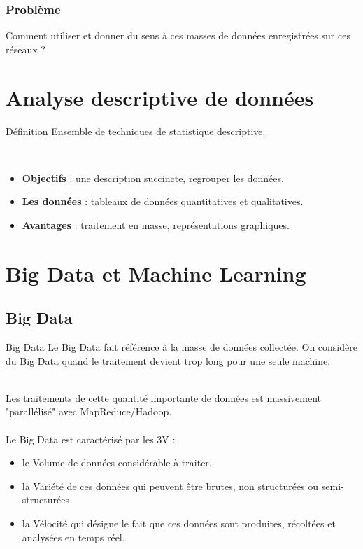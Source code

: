 	\begin{frame}
	\frametitle{Problème}
		Comment utiliser et donner du sens à ces masses de données enregistrées sur ces réseaux ?
	\end{frame}
	
	\section{Analyse descriptive de données}
	\begin{frame}
		\begin{block}{Définition}
		Ensemble de techniques de statistique descriptive.
		\end{block}
		~\\
		\begin{itemize}
		\pause\item \textbf{Objectifs} : une description succincte, regrouper les données.
		\pause\item \textbf{Les données} : tableaux de données quantitatives et qualitatives.
		\pause\item \textbf{Avantages} : traitement en masse, représentations graphiques.
		\end{itemize}
	\end{frame}
	
	\section{Big Data et Machine Learning}
	\subsection{Big Data}
	\begin{frame}
		\begin{block}{Big Data}
		Le Big Data fait référence à la masse de données collectée. On considère du Big Data quand le traitement devient trop long pour une seule machine.
		\end{block}
		~\\
		\pause
		Les traitements de cette quantité importante de données est massivement "parallélisé" avec MapReduce/Hadoop.
		\\~\\
		\pause
		Le Big Data est caractérisé par les 3V :
		\begin{itemize}
			\pause\item le Volume de données considérable à traiter.
			\pause\item la Variété de ces données qui peuvent être brutes, non structurées ou semi-structurées
			\pause\item la Vélocité qui désigne le fait que ces données sont produites, récoltées et analysées en temps réel.
		\end{itemize} 
	\end{frame}
